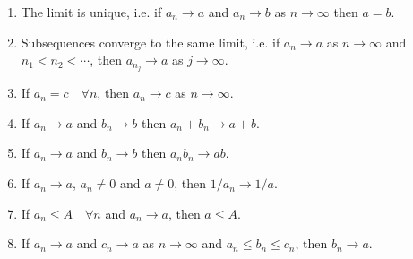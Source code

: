 \documentclass[10pt, a4paper, twoside]{report}
\begin{document}
\begin{lemma} \hfill
    \begin{enumerate}
        \item The limit is unique, i.e. if \(a_n\to a\) and \(a_n\to b\) as \(n\to\infty\) then \(a=b\).
        \item Subsequences converge to the same limit, i.e. if \(a_n\to a\) as \(n\to \infty\) and \(n_1<n_2<\cdots\), then \(a_{n_j}\to a\) as \(j\to\infty\).
        \item If \(a_n=c\quad\forall n\), then \(a_n\to c\) as \(n\to\infty\).
        \item If \(a_n\to a\) and \(b_n\to b\) then \(a_n+b_n\to a+b\).
        \item If \(a_n\to a\) and \(b_n\to b\) then \(a_nb_n\to ab\).
        \item If \(a_n\to a\), \(a_n\neq 0\) and \(a\neq 0\), then \(1/a_n\to 1/a\).
        \item If \(a_n\leq A\quad\forall n\) and \(a_n\to a\), then \(a\leq A\).
        \item If \(a_n\to a\) and \(c_n\to a\) as \(n\to\infty\) and
        \(a_n\leq b_n\leq c_n\), then \(b_n\to a\).
    \end{enumerate}
    \label{fundlemma}
\end{lemma}
\end{document}
